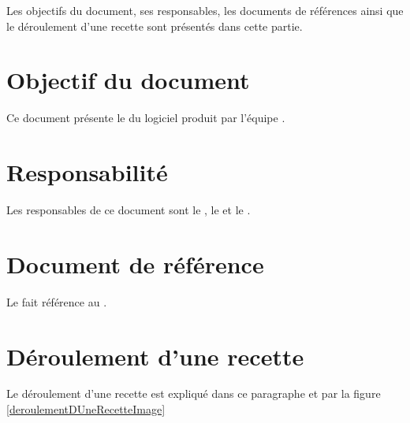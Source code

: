 	
	Les objectifs du document, ses responsables, les documents de références ainsi que le déroulement d'une recette sont présentés dans cette partie.

\section{Objectif du document}
	Ce document présente le \PTV{} du logiciel produit par l'équipe \nomEquipe{}.
	
\section{Responsabilité}
	Les responsables de ce document sont le \CP, le \RQ{} et le \RD.
	
\section{Document de référence}
	Le \PTV{} fait référence au \DSE.
	
\section{Déroulement d'une recette}
Le déroulement d'une recette est expliqué dans ce paragraphe et par la figure \ref{deroulementDUneRecetteImage} \\

